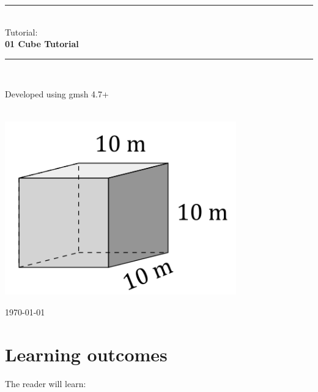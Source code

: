 \documentclass{report}
\newcommand{\HRule}{\rule{\linewidth}{0.5mm}}
\begin{document}
 \begin{titlepage}
  \begin{center}
 
 
	

	

        \HRule \\[0.4cm]
        Tutorial:\\[0.2cm]
	{ \huge \bfseries 01 Cube Tutorial}\\[0.4cm]
	\HRule \\[1cm]

        \begin{minipage}{0.35\textwidth}
        Developed using gmsh 4.7+ \newline \newline \newline \newline \newline \newline \newline \\
	\end{minipage}\\[1cm]

	

	\includegraphics[width=10cm]{cube_tech_ill.png}
	
	\vfill


	{\large \today}
	 
	\end{center}

 \end{titlepage}


\chapter*{Learning outcomes}

\noindent The reader will learn:\\[0.4cm]
\end{document}
